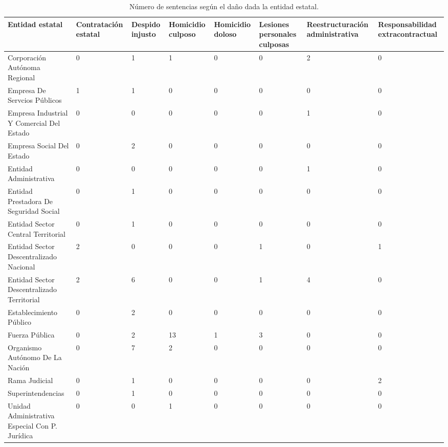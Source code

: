 \begin{table}[!htbp]
\centering
\caption{Número de sentencias según el daño dada la entidad estatal.} 
\label{tab:entidaddano}
\begin{tabular}{p{5cm}R{2cm}R{2cm}R{2cm}R{2cm}R{2cm}R{2cm}R{2cm}}
  \hline
Entidad estatal & Contratación estatal & Despido injusto & Homicidio culposo & Homicidio doloso & Lesiones personales culposas & Reestructuración administrativa & Responsabilidad extracontractual \\ 
  \hline
Corporación Autónoma Regional &  0 &  1 &  1 &  0 &  0 &  2 &  0 \\ 
  Empresa De Servcios Públicos &  1 &  1 &  0 &  0 &  0 &  0 &  0 \\ 
  Empresa Industrial Y Comercial Del Estado &  0 &  0 &  0 &  0 &  0 &  1 &  0 \\ 
  Empresa Social Del Estado &  0 &  2 &  0 &  0 &  0 &  0 &  0 \\ 
  Entidad Administrativa &  0 &  0 &  0 &  0 &  0 &  1 &  0 \\ 
  Entidad Prestadora De Seguridad Social &  0 &  1 &  0 &  0 &  0 &  0 &  0 \\ 
  Entidad Sector Central Territorial &  0 &  1 &  0 &  0 &  0 &  0 &  0 \\ 
  Entidad Sector Descentralizado Nacional &  2 &  0 &  0 &  0 &  1 &  0 &  1 \\ 
  Entidad Sector Descentralizado Territorial &  2 &  6 &  0 &  0 &  1 &  4 &  0 \\ 
  Establecimiento Público &  0 &  2 &  0 &  0 &  0 &  0 &  0 \\ 
  Fuerza Pública &  0 &  2 & 13 &  1 &  3 &  0 &  0 \\ 
  Organismo Autónomo De La Nación &  0 &  7 &  2 &  0 &  0 &  0 &  0 \\ 
  Rama Judicial &  0 &  1 &  0 &  0 &  0 &  0 &  2 \\ 
  Superintendencias &  0 &  1 &  0 &  0 &  0 &  0 &  0 \\ 
  Unidad Administrativa Especial Con P. Jurídica &  0 &  0 &  1 &  0 &  0 &  0 &  0 \\ 
   \hline
\end{tabular}
\end{table}
